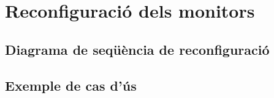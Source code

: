 
\chapter{Reconfiguració dels monitors} %

\section{Diagrama de seqüència de reconfiguració}

\section{Exemple de cas d'ús}